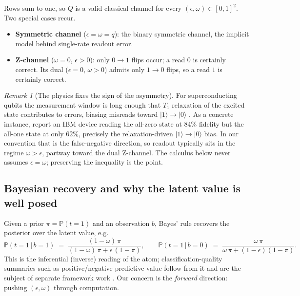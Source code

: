 \documentclass[a4paper,onecolumn,unpublished,nopdfoutputerror,allowtoday]{quantumarticle}
\numberwithin{equation}{section}
\theoremstyle{plain}
\theoremstyle{definition}
\theoremstyle{remark}
\newtheorem{remark}[theorem]{Remark}
\newcommand{\eps}{\epsilon}
\newcommand{\Prob}{\mathbb{P}}
\newcommand{\given}{\,\vert\,}
\newcommand{\ket}[1]{\lvert #1 \rangle}
\begin{document}
Rows sum to one, so $Q$ is a valid classical channel for every
$(\eps,\omega)\in[0,1]^2$. Two special cases recur.

\begin{itemize}[leftmargin=1.4em]
  \item \textbf{Symmetric channel} ($\eps=\omega=q$): the binary symmetric
        channel, the implicit model behind single-rate readout error.
  \item \textbf{Z-channel} ($\omega=0$, $\eps>0$): only $0\!\to\!1$ flips occur;
        a read $0$ is certainly correct. Its dual ($\eps=0$, $\omega>0$) admits
        only $1\!\to\!0$ flips, so a read $1$ is certainly correct.
\end{itemize}

\begin{remark}[The physics fixes the sign of the asymmetry]
\label{rem:t1}
For superconducting qubits the measurement window is long enough that $T_1$
relaxation of the excited state contributes to errors, biasing misreads toward
$\ket{1}\!\to\!\ket{0}$ \citep{tannu2019mitigating,hicks2021readout}. As a
concrete instance, \citet{tannu2019mitigating} report an IBM device reading the
all-zero state at $84\%$ fidelity but the all-one state at only $62\%$, precisely
the relaxation-driven $\ket{1}\!\to\!\ket{0}$ bias. In our
convention that is the false-negative direction, so readout typically sits in the
regime $\omega > \eps$, partway toward the dual Z-channel. The calculus below
never assumes $\eps=\omega$; preserving the inequality is the point.
\end{remark}

\subsection{Bayesian recovery and why the latent value is well posed}

Given a prior $\pi=\Prob(t=1)$ and an observation $b$, Bayes' rule recovers the
posterior over the latent value, e.g.
\begin{equation}
\label{eq:bayes}
  \Prob(t=1\given b=1) \;=\;
  \frac{(1-\omega)\,\pi}{(1-\omega)\,\pi + \eps\,(1-\pi)},
  \qquad
  \Prob(t=1\given b=0) \;=\;
  \frac{\omega\,\pi}{\omega\,\pi + (1-\eps)(1-\pi)} .
\end{equation}
This is the inferential (inverse) reading of the atom; classification-quality
summaries such as positive/negative predictive value follow from it and are the
subject of separate framework work \citep{bernoulliMeasures}. Our concern is the
\emph{forward} direction: pushing $(\eps,\omega)$ through computation.
\end{document}
